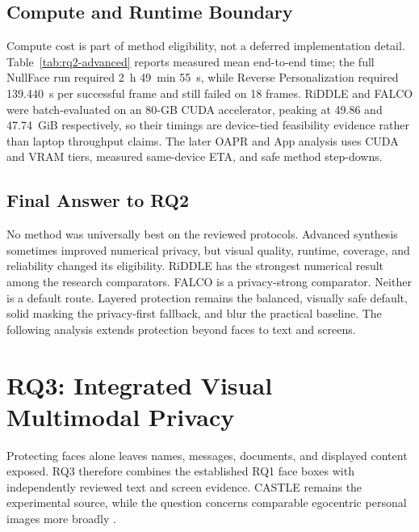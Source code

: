 \documentclass[10pt,twocolumn]{IEEEtran}
\begin{document}
\subsection{Compute and Runtime Boundary}

Compute cost is part of method eligibility, not a deferred implementation
detail. Table~\ref{tab:rq2-advanced} reports measured mean end-to-end time;
the full NullFace run required 2~h 49~min 55~s, while Reverse Personalization
required 139.440~s per successful frame and still failed on 18 frames. RiDDLE
and FALCO were batch-evaluated on an 80-GB CUDA accelerator, peaking at 49.86
and 47.74~GiB respectively, so their timings are device-tied feasibility
evidence rather than laptop throughput claims. The later OAPR and App analysis
uses CUDA and VRAM tiers, measured same-device ETA, and safe method step-downs.

\subsection{Final Answer to RQ2}

No method was universally best on the reviewed protocols. Advanced synthesis
sometimes improved numerical privacy, but visual quality, runtime, coverage,
and reliability changed its eligibility. RiDDLE has the strongest numerical
result among the research comparators. FALCO is a privacy-strong comparator.
Neither is a default route.
Layered protection remains the balanced, visually safe default, solid masking
the privacy-first fallback, and blur the practical baseline. The following
analysis extends protection beyond faces to text and screens.

\clearpage

\section{RQ3: Integrated Visual Multimodal Privacy}
\label{sec:rq3}

Protecting faces alone leaves names, messages, documents, and displayed content
exposed. RQ3 therefore combines the established RQ1 face boxes with independently
reviewed text and screen evidence. CASTLE remains the experimental source, while
the question concerns comparable egocentric personal images more broadly
\cite{rossetto2025castle}.
\end{document}
